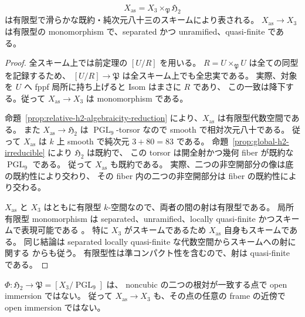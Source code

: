 \begin{corollary}
\label{cor:global-xas-smooth-scheme}
\[
 X_{\mathrm{as}}=X_3\times_{\mathfrak P}\mathfrak H_2
\]
は有限型で滑らかな既約・純次元八十三のスキームにより表される。
$X_{\mathrm{as}}\to X_3$ は有限型の monomorphism で、separated かつ unramified、quasi-finite である。
\end{corollary}

\begin{proof}
全スキーム上では前定理の $[U/R]$ を用いる。
$R=U\times_{\mathfrak P}U$ は全ての同型を記録するため、
$[U/R]\to\mathfrak P$ は全スキーム上でも全忠実である。
実際、対象を $U$ へ fppf 局所に持ち上げると Isom はまさに $R$ であり、
この一致は降下する。従って $X_{\mathrm{as}}\to X_3$ は monomorphism である。

命題~\ref{prop:relative-h2-algebraicity-reduction} により、$X_{\mathrm{as}}$ は有限型代数空間である。
また $X_{\mathrm{as}}\to\mathfrak H_2$ は $\operatorname{PGL}_9$-torsor なので smooth で相対次元八十である。
従って $X_{\mathrm{as}}$ は $k$ 上 smooth で純次元 $3+80=83$ である。
命題~\ref{prop:global-h2-irreducible} により $\mathfrak H_2$ は既約で、
この torsor は開全射かつ幾何 fiber が既約な $\operatorname{PGL}_9$ である。
従って $X_{\mathrm{as}}$ も既約である。
実際、二つの非空開部分の像は底の既約性により交わり、
その fiber 内の二つの非空開部分は fiber の既約性により交わる。

$X_{\mathrm{as}}$ と $X_3$ はともに有限型 $k$-空間なので、両者の間の射は有限型である。
局所有限型 monomorphism は separated、unramified、locally quasi-finite かつスキームで表現可能である
\cite[Tag 05W6, Lemma 76.14.8]{StacksRepresentableMonomorphism}。
特に $X_3$ がスキームであるため $X_{\mathrm{as}}$ 自身もスキームである。
同じ結論は separated locally quasi-finite な代数空間からスキームへの射に関する
\cite[Tag 03XX, Proposition 67.50.2]{StacksRepresentableMonomorphism} からも従う。
有限型性は準コンパクト性を含むので、射は quasi-finite である。
\end{proof}

\begin{proposition}
\label{prop:global-h2-not-ambient-open}
$\Phi:\mathfrak H_2\to\mathfrak P=[X_3/\operatorname{PGL}_9]$ は、
noncubic の二つの根対が一致する点で open immersion ではない。
従って $X_{\mathrm{as}}\to X_3$ も、その点の任意の frame の近傍で open immersion ではない。
\end{proposition}

